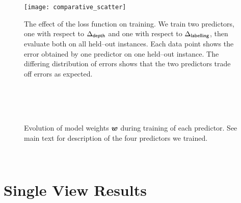 \begin{figure}[tb]%
  \centering
  \texttt{[image: comparative\_scatter]}
  \caption{The effect of the loss function on training. We train two
    predictors, one with respect to $\DepthLoss$ and one with respect
    to $\LblLoss$, then evaluate both on all held--out instances. Each
    data point shows the error obtained by one predictor on one held--out
    instance. The differing distribution of errors shows that the two
    predictors trade off errors as expected.}
  \label{fig:comparative-scatter}
\end{figure}

\begin{figure}[tb]
  \centering
  \\
  \\
  \\
  \caption{Evolution of model weights $\Model$ during training of each
    predictor. See main text for description of the four predictors we
    trained.}
  \label{fig:psi-evolution}
\end{figure}

\begin{figure}[tb]
  \centering
  \\
  \caption{}
  \label{fig:learned-weights}
\end{figure}

\section{Single View Results}
\label{sec:sv-results}

